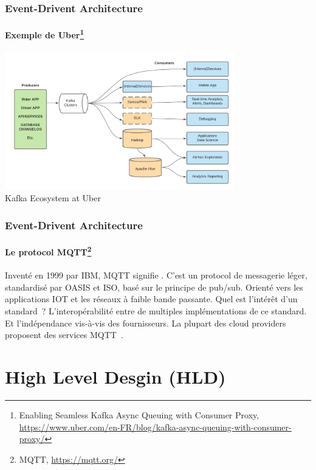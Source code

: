 \documentclass{beamer}
\begin{document}
    \begin{frame}
        \transdissolve
        \frametitle{Event-Drivent Architecture}
        \framesubtitle{Exemple de Uber\footnote{Enabling Seamless Kafka Async Queuing with Consumer Proxy, \url{https://www.uber.com/en-FR/blog/kafka-async-queuing-with-consumer-proxy/}}}
        \centering
        \includegraphics[width=10cm]{image/uber-kafka} \\ Kafka Ecosystem at Uber \\
    \end{frame}

    \begin{frame}
        \transdissolve
        \frametitle{Event-Drivent Architecture}
        \framesubtitle{Le protocol MQTT\footnote{MQTT, \url{https://mqtt.org/}}}
        Inventé en 1999 par IBM, MQTT signifie .
        \bigbreak
        C'est un protocol de messagerie léger, standardisé par OASIS et ISO, basé sur le principe de pub/sub.
        Orienté vers les applications IOT et les réseaux à faible bande passante.
        \bigbreak
        Quel est l'intérêt d'un standard~?
        \pause
        \bigbreak
        L'interopérabilité entre de multiples implémentations de ce standard.
        Et l'indépendance vis-à-vis des fournisseurs.
        La plupart des cloud providers proposent des services MQTT~.
    \end{frame}


    \section{High Level Desgin (HLD)}\label{sec:high-level-design}
\end{document}
